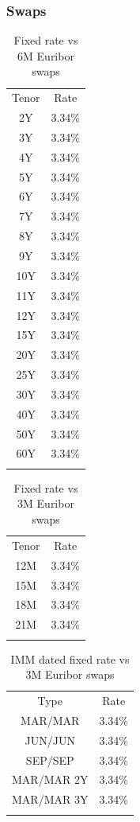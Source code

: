 \documentclass[11pt,reqno]{amsart}
\begin{document}
\subsubsection{\label{SecSwap}Swaps}
\begin{table}[tbp]
\label{tab:swaps6M}
\begin{tabular}{cc}
Tenor & Rate \\
2Y  & 3.34\% \\
3Y  & 3.34\% \\
4Y  & 3.34\% \\
5Y  & 3.34\% \\
6Y  & 3.34\% \\
7Y  & 3.34\% \\
8Y  & 3.34\% \\
9Y  & 3.34\% \\
10Y & 3.34\% \\
11Y & 3.34\% \\
12Y & 3.34\% \\
15Y & 3.34\% \\
20Y & 3.34\% \\
25Y & 3.34\% \\
30Y & 3.34\% \\
40Y & 3.34\% \\
50Y & 3.34\% \\
60Y & 3.34\% \\
&
\end{tabular}%
\caption{Fixed rate vs 6M Euribor swaps}
\end{table}

\begin{table}[tbp]
\label{tab:swaps3M}
\begin{tabular}{cc}
Tenor & Rate \\
12M & 3.34\% \\
15M & 3.34\% \\
18M & 3.34\% \\
21M & 3.34\% \\
&
\end{tabular}%
\caption{Fixed rate vs 3M Euribor swaps}
\end{table}

\begin{table}[tbp]
\label{tab:swapsIMM}
\begin{tabular}{cc}
Type & Rate \\
MAR/MAR & 3.34\% \\
JUN/JUN & 3.34\% \\
SEP/SEP & 3.34\% \\
MAR/MAR 2Y & 3.34\% \\
MAR/MAR 3Y & 3.34\% \\
&
\end{tabular}%
\caption{IMM dated fixed rate vs 3M Euribor swaps}
\end{table}
\end{document}
